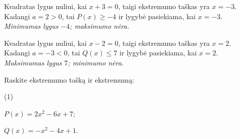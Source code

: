 \documentclass[11pt,a4paper]{scrartcl}
\numberwithin{exercise}{section}
\begin{document}
\begin{solution}\hfill\par

 Kvadratas lygus nuliui, kai $x+3=0$, taigi ekstremumo taškas yra $x=-3$. Kadangi $a=2>0$, tai $P(x)\geq-4$ ir lygybė pasiekiama, kai $x=-3$. \emph{Minimumas lygus $-4$; maksimumo nėra.}



 Kvadratas lygus nuliui, kai $x-2=0$, taigi ekstremumo taškas yra $x=2$. Kadangi $a=-3<0$, tai $Q(x)\leq7$ ir lygybė pasiekiama, kai $x=2$. \emph{Maksimumas lygus $7$; minimumo nėra.}


\end{solution}


\begin{example}\label{pv:trinaris}

Raskite ekstremumo tašką ir ekstremumą:

\begin{tasks}[label=\alph*),label-width=1.4em,label-offset=0.1em,item-indent=1.5em](1)

\task $P(x)=2x^2-6x+7$;

\task $Q(x)=-x^2-4x+1$.

\end{tasks}

\end{example}
\end{document}
